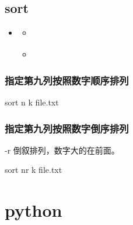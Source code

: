 \documentclass[letterpaper,10pt,english]{sphinxmanual}
\begin{document}
\subsection{sort}
\label{\detokenize{scripts/shell/sort:sort}}\label{\detokenize{scripts/shell/sort::doc}}
\begin{sphinxShadowBox}
\begin{itemize}
\item {} 
\label{\detokenize{scripts/shell/sort:id3}}{\hyperref[\detokenize{scripts/shell/sort:sort}]{}}
\begin{itemize}
\item {} 
\label{\detokenize{scripts/shell/sort:id4}}{\hyperref[\detokenize{scripts/shell/sort:id1}]{}}

\item {} 
\label{\detokenize{scripts/shell/sort:id5}}{\hyperref[\detokenize{scripts/shell/sort:id2}]{}}

\end{itemize}

\end{itemize}
\end{sphinxShadowBox}


\subsubsection{指定第九列按照数字顺序排列}
\label{\detokenize{scripts/shell/sort:id1}}
%
\begin{sphinxVerbatim}[commandchars=\\\{\}]
sort \PYGZhy{}n \PYGZhy{}k  file.txt
\end{sphinxVerbatim}


\subsubsection{指定第九列按照数字倒序排列}
\label{\detokenize{scripts/shell/sort:id2}}
-r 倒叙排列，数字大的在前面。

%
\begin{sphinxVerbatim}[commandchars=\\\{\}]
sort \PYGZhy{}nr \PYGZhy{}k  file.txt
\end{sphinxVerbatim}


\section{python}
\label{\detokenize{scripts/python:python}}\label{\detokenize{scripts/python::doc}}
\end{document}
